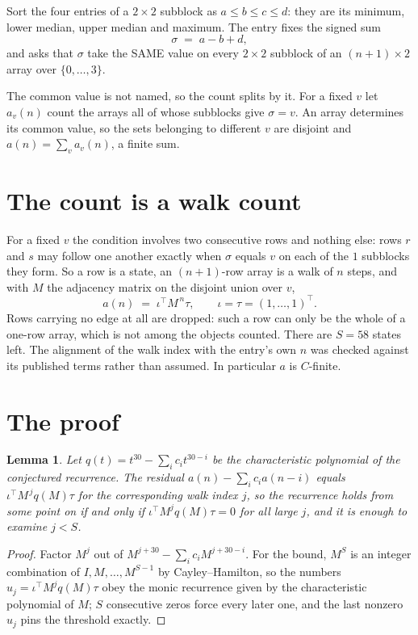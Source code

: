 \documentclass[11pt,a4paper]{article}
\theoremstyle{plain}
\newtheorem{lemma}[theorem]{Lemma}
\theoremstyle{definition}
\begin{document}
Sort the four entries of a $2\times2$ subblock as $a\le b\le c\le d$: they
are its minimum, lower median, upper median and maximum. The entry fixes the signed sum
\[
\sigma\;=\;a-b+d,
\]
and asks that $\sigma$ take the SAME value on every $2\times2$ subblock of an
$(n+1)\times2$ array over $\{0,\dots,3\}$.

The common value is not named, so the count splits by it. For a fixed $v$ let $a_v(n)$ count
the arrays all of whose subblocks give $\sigma=v$. An array determines its common value, so
the sets belonging to different $v$ are disjoint and $a(n)=\sum_v a_v(n)$, a finite sum.


\section{The count is a walk count}

For a fixed $v$ the condition involves two consecutive rows and nothing
else: rows $r$ and $s$ may follow one another exactly when $\sigma$ equals $v$ on each of the
$1$ subblocks they form. So a row is a state, an $(n+1)$-row array is a walk of $n$
steps, and with $M$ the adjacency matrix on the disjoint union over $v$,
\[
a(n)\;=\;\iota^{\!\top}M^{\,n}\tau,\qquad\iota=\tau=(1,\dots,1)^{\!\top} .
\]
Rows carrying no edge at all are dropped: such a row can only be the whole of a one-row
array, which is not among the objects counted. There are $S=58$ states left.
The alignment of the walk index with the entry's own $n$ was checked against its published
terms rather than assumed. In particular $a$ is $C$-finite.

\section{The proof}

\begin{lemma}\label{lem:crit}
Let $q(t)=t^{30}-\sum_i c_it^{30-i}$ be the characteristic polynomial of the
conjectured recurrence. The residual $a(n)-\sum_ic_ia(n-i)$ equals
$\iota^{\!\top}M^{\,j}q(M)\tau$ for the corresponding walk index $j$, so the recurrence
holds from some point on if and only if $\iota^{\!\top}M^{j}q(M)\tau=0$ for all large $j$,
and it is enough to examine $j<S$.
\end{lemma}

\begin{proof}
Factor $M^{j}$ out of $M^{j+30}-\sum_ic_iM^{j+30-i}$. For the bound, $M^{S}$
is an integer combination of $I,M,\dots,M^{S-1}$ by Cayley--Hamilton, so the numbers
$u_j=\iota^{\!\top}M^{j}q(M)\tau$ obey the monic recurrence given by the characteristic
polynomial of $M$; $S$ consecutive zeros force every later one, and the last nonzero $u_j$
pins the threshold exactly.
\end{proof}
\end{document}
